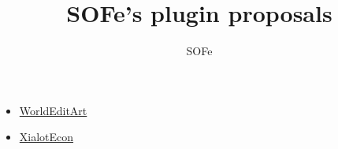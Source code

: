 \documentclass{article}
\title{SOFe's plugin proposals}
\author{SOFe}
\def \prop #1{\item \href{https://sof3.github.io/plugin-proposals/#1}{#1}}
\begin{document}
	\maketitle
	\begin{itemize}
		\prop{WorldEditArt}
		\prop{XialotEcon}
	\end{itemize}
\end{document}
